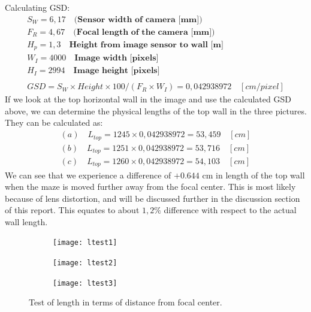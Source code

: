 Calculating GSD:
\begin{align*}
S_W = 6,17 \quad \textbf{(Sensor width of camera [mm])}\\
F_R = 4,67 \quad \textbf{(Focal length of the camera [mm])}\\
H_p = 1,3 \quad \textbf{Height from image sensor to wall [m]}\\
W_I = 4000 \quad \textbf{Image width [pixels]}\\
H_I = 2994 \quad \textbf{Image height [pixels]}\\\\
GSD = S_W \times Height \times 100 / (F_R \times W_I) = 0,042938972 \quad [cm/pixel]
\end{align*}
If we look at the top horizontal wall in the image and use the calculated GSD above, we can determine the physical lengths of the top wall in the three pictures. They can be calculated as:
\begin{align*}
(a)\quad L_{top} = 1245\times 0,042938972 = 53,459\quad[cm]\\
(b)\quad L_{top} = 1251\times 0,042938972 = 53,716\quad[cm]\\
(c)\quad L_{top} = 1260\times 0,042938972 = 54,103\quad[cm]
\end{align*}
We can see that we experience a difference of $+0.644$ cm in length of the top wall when the maze is moved further away from the focal center. This is most likely because of lens distortion, and will be discussed further in the discussion section of this report. This equates to about $1,2\%$ difference with respect to the actual wall length.
\begin{figure}[H]
\begin{subfigure}{.5\textwidth}
  \centering
  \texttt{[image: ltest1]}
  \caption{}
\end{subfigure}
\begin{subfigure}{.5\textwidth}
  \centering
  \texttt{[image: ltest2]}
  \caption{}
\end{subfigure}
\begin{subfigure}{.5\textwidth}
  \centering
  \texttt{[image: ltest3]}
  \caption{}
\end{subfigure}
\caption{Test of length in terms of distance from focal center.}
\label{ltest}
\end{figure}

